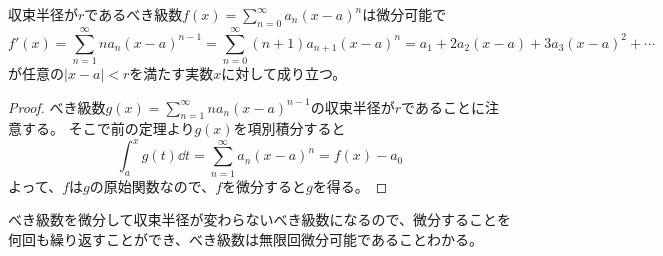 \begin{theorem}[べき級数の項別積分]
収束半径が$r$であるべき級数$f(x) = \sum_{n = 0}^\infty a_n(x-a)^n$は微分可能で
$$
f'(x) = \sum_{n = 1}^\infty n a_n(x-a)^{n-1} = \sum_{n = 0}^\infty (n+1) a_{n+1}(x-a)^n = a_1+2 a_2(x-a)+3 a_3(x-a)^2+\cdots
$$
が任意の$|x-a| < r$を満たす実数$x$に対して成り立つ。
\end{theorem}

\begin{proof}
べき級数$g(x) = \sum_{n = 1}^\infty n a_n(x-a)^{n-1}$の収束半径が$r$であることに注意する。
そこで前の定理より$g(x)$を項別積分すると
$$
\int_a^x g(t)\dd{t} = \sum_{n = 1}^\infty a_n(x-a)^n = f(x)-a_0
$$
よって、$f$は$g$の原始関数なので、$f$を微分すると$g$を得る。
\end{proof}

\begin{remark}
べき級数を微分して収束半径が変わらないべき級数になるので、微分することを何回も繰り返すことができ、べき級数は無限回微分可能であることわかる。
\end{remark}

